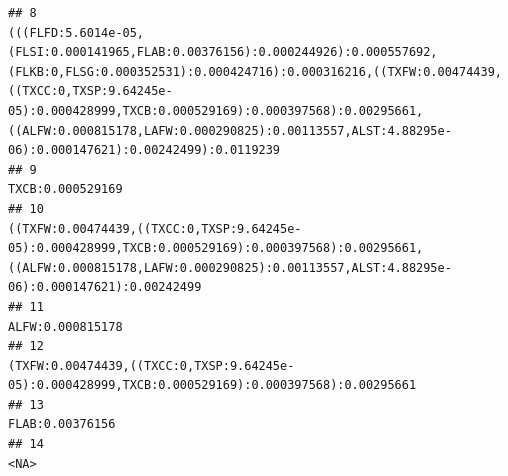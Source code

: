 \documentclass[]{article}
\begin{document}
\begin{verbatim}
## 8                                                                                           (((FLFD:5.6014e-05,(FLSI:0.000141965,FLAB:0.00376156):0.000244926):0.000557692,(FLKB:0,FLSG:0.000352531):0.000424716):0.000316216,((TXFW:0.00474439,((TXCC:0,TXSP:9.64245e-05):0.000428999,TXCB:0.000529169):0.000397568):0.00295661,((ALFW:0.000815178,LAFW:0.000290825):0.00113557,ALST:4.88295e-06):0.000147621):0.00242499):0.0119239
## 9                                                                                                                                                                                                                                                                                                                                                                                                                    TXCB:0.000529169
## 10                                                                                                                                                                                                                                       ((TXFW:0.00474439,((TXCC:0,TXSP:9.64245e-05):0.000428999,TXCB:0.000529169):0.000397568):0.00295661,((ALFW:0.000815178,LAFW:0.000290825):0.00113557,ALST:4.88295e-06):0.000147621):0.00242499
## 11                                                                                                                                                                                                                                                                                                                                                                                                                   ALFW:0.000815178
## 12                                                                                                                                                                                                                                                                                                                                  (TXFW:0.00474439,((TXCC:0,TXSP:9.64245e-05):0.000428999,TXCB:0.000529169):0.000397568):0.00295661
## 13                                                                                                                                                                                                                                                                                                                                                                                                                    FLAB:0.00376156
## 14                                                                                                                                                                                                                                                                                                                                                                                                                               <NA>

\end{verbatim}
\end{document}
